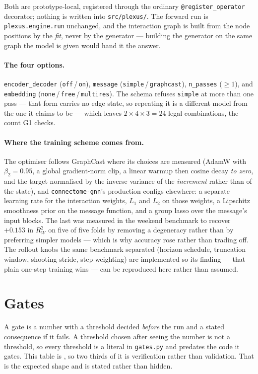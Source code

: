 \documentclass[11pt,a4paper]{article}
\newcommand{\code}[1]{\texttt{\small #1}}
\begin{document}
\noindent
Both are prototype-local, registered through the ordinary \code{@register\_operator} decorator;
nothing is written into \code{src/plexus/}. The forward run is \code{plexus.engine.run} unchanged,
and the interaction graph is built from the node positions by the \emph{fit}, never by the
generator --- building the generator on the same graph the model is given would hand it the answer.

\paragraph{The four options.} \code{encoder\_decoder} (\code{off}\,/\,\code{on}), \code{message}
(\code{simple}\,/\,\code{graphcast}), \code{n\_passes} ($\geq 1$), and \code{embedding}
(\code{none}\,/\,\code{free}\,/\,\code{multires}). The schema refuses \code{simple} at more than
one pass --- that form carries no edge state, so repeating it is a different model from the one it
claims to be --- which leaves $2 \times 4 \times 3 = 24$ legal combinations, the count G1 checks.

\paragraph{Where the training scheme comes from.} The optimiser follows GraphCast where its choices
are measured (AdamW with $\beta_2 = 0.95$, a global gradient-norm clip, a linear warmup then cosine
decay \emph{to zero}, and the target normalised by the inverse variance of the \emph{increment}
rather than of the state), and \code{connectome-gnn}'s production configs elsewhere: a separate
learning rate for the interaction weights, $L_1$ and $L_2$ on those weights, a Lipschitz smoothness
prior on the message function, and a group lasso over the message's input blocks. The last was
measured in the weekend benchmark to recover $+0.153$ in $R^2_W$ on five of five folds by removing
a degeneracy rather than by preferring simpler models --- which is why accuracy rose rather than
trading off. The rollout knobs the same benchmark separated (horizon schedule, truncation window,
shooting stride, step weighting) are implemented so its finding --- that plain one-step training
wins --- can be reproduced here rather than assumed.

\section{Gates}

A gate is a number with a threshold decided \emph{before} the run and a stated consequence if it
fails. A threshold chosen after seeing the number is not a threshold, so every threshold is a
literal in \code{gates.py} and predates the code it gates. This table is \tierProportion, so two
thirds of it is verification rather than validation. That is the expected shape and is stated
rather than hidden.
\end{document}
